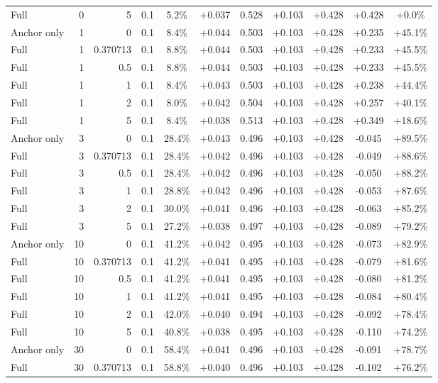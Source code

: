 \begin{table}[htbp]
\begin{tabular}{lrrrccccccc}
Full & 0 & 5 & 0.1 & 5.2\% & +0.037 & 0.528 & +0.103 & +0.428 & +0.428 & +0.0\% \\
Anchor only & 1 & 0 & 0.1 & 8.4\% & +0.044 & 0.503 & +0.103 & +0.428 & +0.235 & +45.1\% \\
Full & 1 & 0.370713 & 0.1 & 8.8\% & +0.044 & 0.503 & +0.103 & +0.428 & +0.233 & +45.5\% \\
Full & 1 & 0.5 & 0.1 & 8.8\% & +0.044 & 0.503 & +0.103 & +0.428 & +0.233 & +45.5\% \\
Full & 1 & 1 & 0.1 & 8.4\% & +0.043 & 0.503 & +0.103 & +0.428 & +0.238 & +44.4\% \\
Full & 1 & 2 & 0.1 & 8.0\% & +0.042 & 0.504 & +0.103 & +0.428 & +0.257 & +40.1\% \\
Full & 1 & 5 & 0.1 & 8.4\% & +0.038 & 0.513 & +0.103 & +0.428 & +0.349 & +18.6\% \\
Anchor only & 3 & 0 & 0.1 & 28.4\% & +0.043 & 0.496 & +0.103 & +0.428 & -0.045 & +89.5\% \\
Full & 3 & 0.370713 & 0.1 & 28.4\% & +0.042 & 0.496 & +0.103 & +0.428 & -0.049 & +88.6\% \\
Full & 3 & 0.5 & 0.1 & 28.4\% & +0.042 & 0.496 & +0.103 & +0.428 & -0.050 & +88.2\% \\
Full & 3 & 1 & 0.1 & 28.8\% & +0.042 & 0.496 & +0.103 & +0.428 & -0.053 & +87.6\% \\
Full & 3 & 2 & 0.1 & 30.0\% & +0.041 & 0.496 & +0.103 & +0.428 & -0.063 & +85.2\% \\
Full & 3 & 5 & 0.1 & 27.2\% & +0.038 & 0.497 & +0.103 & +0.428 & -0.089 & +79.2\% \\
Anchor only & 10 & 0 & 0.1 & 41.2\% & +0.042 & 0.495 & +0.103 & +0.428 & -0.073 & +82.9\% \\
Full & 10 & 0.370713 & 0.1 & 41.2\% & +0.041 & 0.495 & +0.103 & +0.428 & -0.079 & +81.6\% \\
Full & 10 & 0.5 & 0.1 & 41.2\% & +0.041 & 0.495 & +0.103 & +0.428 & -0.080 & +81.2\% \\
Full & 10 & 1 & 0.1 & 41.2\% & +0.041 & 0.495 & +0.103 & +0.428 & -0.084 & +80.4\% \\
Full & 10 & 2 & 0.1 & 42.0\% & +0.040 & 0.494 & +0.103 & +0.428 & -0.092 & +78.4\% \\
Full & 10 & 5 & 0.1 & 40.8\% & +0.038 & 0.495 & +0.103 & +0.428 & -0.110 & +74.2\% \\
Anchor only & 30 & 0 & 0.1 & 58.4\% & +0.041 & 0.496 & +0.103 & +0.428 & -0.091 & +78.7\% \\
Full & 30 & 0.370713 & 0.1 & 58.8\% & +0.040 & 0.496 & +0.103 & +0.428 & -0.102 & +76.2\% \\

\end{tabular}
\end{table}
